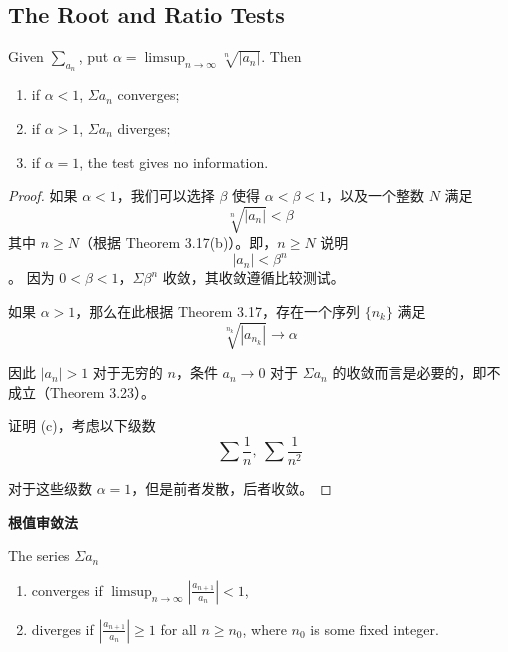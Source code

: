 \documentclass[../poma-notes.tex]{subfiles}
\begin{document}
\subsection*{The Root and Ratio Tests}

\begin{theorem}
  Given $\sum_{a_n}$, put $\alpha = \limsup_{n \to \infty} \sqrt[n]{|a_n|}$.
  Then
  \begin{enumerate}[label=(\alph*)]
    \item if $\alpha < 1$, $\Sigma a_n$ converges;
    \item if $\alpha > 1$, $\Sigma a_n$ diverges;
    \item if $\alpha = 1$, the test gives no information.
  \end{enumerate}
\end{theorem}

\begin{proof}
  如果 $\alpha < 1$，我们可以选择 $\beta$ 使得 $\alpha < \beta < 1$，以及一个整数 $N$ 满足
  \[ \sqrt[n]{|a_n|} < \beta \]
  其中 $n \ge N$（根据 Theorem 3.17(b)）。即，$n \ge N$ 说明
  \[ |a_n| < \beta^n \]。
  因为 $0 < \beta < 1$，$\Sigma \beta^n$ 收敛，其收敛遵循比较测试。

  如果 $\alpha > 1$，那么在此根据 Theorem 3.17，存在一个序列 $\{n_k\}$ 满足
  \[ \sqrt[n_k]{|a_{n_k}|} \to \alpha \]

  因此 $|a_n| > 1$ 对于无穷的 $n$，条件 $a_n \to 0$ 对于 $\Sigma a_n$ 的收敛而言是必要的，即不成立（Theorem 3.23）。

  证明 (c)，考虑以下级数
  \[
    \sum \frac{1}{n}, \ \sum \frac{1}{n^2}
  \]

  对于这些级数 $\alpha = 1$，但是前者发散，后者收敛。
\end{proof}

\anote \textbf{根值审敛法}

\begin{theorem}
  The series $\Sigma a_n$
  \begin{enumerate}[label=(\alph*)]
    \item converges if $\limsup_{n \to \infty} |\frac{a_{n+1}}{a_n}| < 1$,
    \item diverges if $|\frac{a_{n+1}}{a_n}| \ge 1$ for all $n \ge n_0$, where $n_0$ is some fixed integer.
  \end{enumerate}
\end{theorem}
\end{document}
